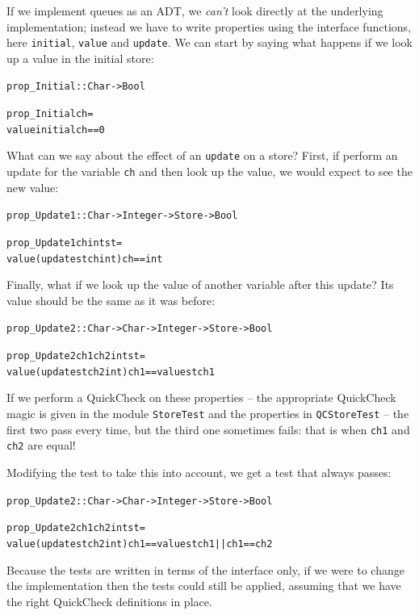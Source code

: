 If we implement queues as an ADT, we \emph{can't} look directly at the underlying implementation; instead we have to write properties using the interface functions, here \texttt{initial}, \texttt{value} and \texttt{update}. We can start by saying what happens if we look up a value in the initial store:
\begin{alltt}
prop\_Initial :: Char -> Bool

prop\_Initial ch =
   value initial ch == 0
\end{alltt}
What can we say about the effect of an \texttt{update} on a store? First, if perform an update for the variable \texttt{ch} and then look up the value, we would expect to see the new value:
\begin{alltt}
prop\_Update1 :: Char -> Integer -> Store -> Bool

prop\_Update1 ch int st =
    value (update st ch int) ch == int
\end{alltt}
Finally, what if we look up the value of another variable after this update? Its value should be the same as it was before:
\begin{alltt}
prop_Update2 :: Char -> Char -> Integer -> Store -> Bool

prop_Update2 ch1 ch2 int st =
    value (update st ch2 int) ch1 == value st ch1
\end{alltt}
If we perform a QuickCheck on these properties -- the appropriate QuickCheck magic is given in the module \texttt{StoreTest} and the properties in \texttt{QCStoreTest} -- the first two pass every time, but the third one sometimes fails: that is when \texttt{ch1} and \texttt{ch2} are equal! 

Modifying the test to take this into account, we get a test that always passes:
\begin{alltt}
prop_Update2 :: Char -> Char -> Integer -> Store -> Bool

prop_Update2 ch1 ch2 int st =
    value (update st ch2 int) ch1 == value st ch1 || ch1==ch2
\end{alltt}
Because the tests are written in terms of the interface only, if we were to change the implementation then the tests could still be applied, assuming that we have the right QuickCheck definitions in place.


